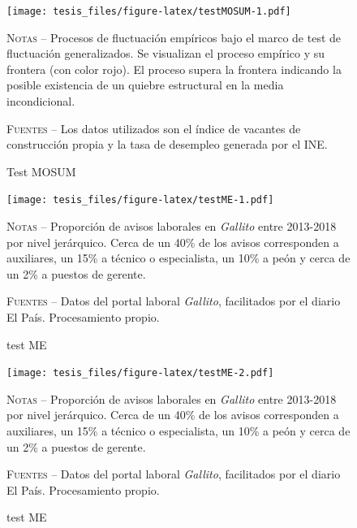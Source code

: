 \documentclass[12pt,oneside]{reedthesis}
\begin{document}
\begin{figure}
\texttt{[image: tesis\_files/figure-latex/testMOSUM-1.pdf]}
\caption{Test MOSUM}\label{fig:testMOSUM}\textsc{}

\footnotesize\textsc{Notas} -- Procesos de fluctuación empíricos bajo el marco de test de fluctuación generalizados. Se visualizan el proceso empírico y su frontera (con color rojo). El proceso supera la frontera indicando la posible existencia de un quiebre estructural en la media incondicional.

\textsc{Fuentes} -- Los datos utilizados son el índice de vacantes de construcción propia y la tasa de desempleo generada por el INE.
\end{figure}
\begin{figure}
\texttt{[image: tesis\_files/figure-latex/testME-1.pdf]}
\caption{test ME}\label{fig:testME}\textsc{}

\footnotesize\textsc{Notas} -- Proporción de avisos laborales en \textit{Gallito} entre 2013-2018 por nivel jerárquico. Cerca de un 40\% de los avisos corresponden a auxiliares, un 15\% a técnico o especialista, un 10\% a peón y cerca de un 2\% a puestos de gerente.

\textsc{Fuentes} -- Datos del portal laboral \textit{Gallito}, facilitados por el diario El País. Procesamiento propio.
\end{figure}
\begin{figure}
\texttt{[image: tesis\_files/figure-latex/testME-2.pdf]}
\caption{test ME}\label{fig:testME}\textsc{}

\footnotesize\textsc{Notas} -- Proporción de avisos laborales en \textit{Gallito} entre 2013-2018 por nivel jerárquico. Cerca de un 40\% de los avisos corresponden a auxiliares, un 15\% a técnico o especialista, un 10\% a peón y cerca de un 2\% a puestos de gerente.

\textsc{Fuentes} -- Datos del portal laboral \textit{Gallito}, facilitados por el diario El País. Procesamiento propio.
\end{figure}
\newpage
\end{document}

